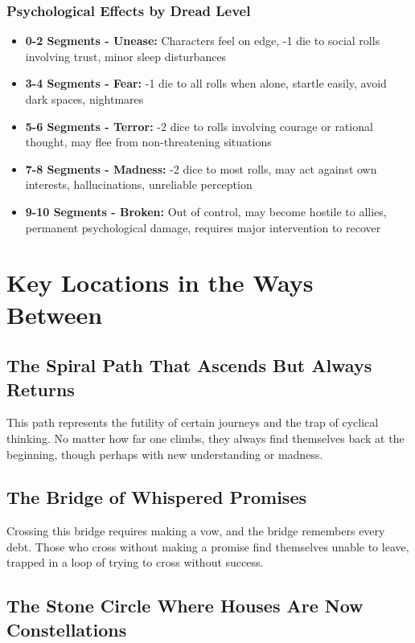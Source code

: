 \documentclass[11pt]{article}
\begin{document}
\subsubsection{Psychological Effects by Dread Level}

\begin{itemize}
\item \textbf{0-2 Segments - Unease:} Characters feel on edge, -1 die to social rolls involving trust, minor sleep disturbances
\item \textbf{3-4 Segments - Fear:} -1 die to all rolls when alone, startle easily, avoid dark spaces, nightmares
\item \textbf{5-6 Segments - Terror:} -2 dice to rolls involving courage or rational thought, may flee from non-threatening situations
\item \textbf{7-8 Segments - Madness:} -2 dice to most rolls, may act against own interests, hallucinations, unreliable perception
\item \textbf{9-10 Segments - Broken:} Out of control, may become hostile to allies, permanent psychological damage, requires major intervention to recover
\end{itemize}

\section{Key Locations in the Ways Between}

\subsection{The Spiral Path That Ascends But Always Returns}

This path represents the futility of certain journeys and the trap of cyclical thinking. No matter how far one climbs, they always find themselves back at the beginning, though perhaps with new understanding or madness.

\subsection{The Bridge of Whispered Promises}

Crossing this bridge requires making a vow, and the bridge remembers every debt. Those who cross without making a promise find themselves unable to leave, trapped in a loop of trying to cross without success.

\subsection{The Stone Circle Where Houses Are Now Constellations}
\end{document}
